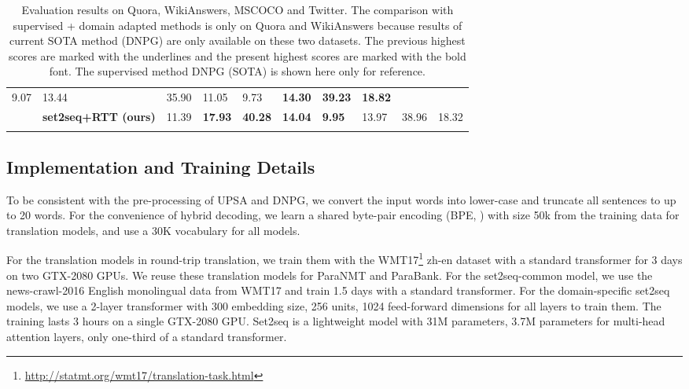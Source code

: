\begin{table*}[ht]
\begin{tabular}{p{2cm}p{4cm}p{0.8cm}<{\centering}p{0.8cm}<{\centering}p{0.8cm}<{\centering}p{0.8cm}<{\centering}p{0.8cm}<{\centering}p{0.8cm}<{\centering}p{0.8cm}<{\centering}p{0.8cm}<{\centering}}
 9.07 & 13.44 & 35.90 & 11.05 &  9.73 & \textbf{14.30} & \textbf{39.23} & \textbf{18.82} \\
& \textbf{set2seq+RTT \scriptsize{(ours)}} & 
11.39 & \textbf{17.93} & \textbf{40.28} & \textbf{14.04} & \textbf{9.95} & 13.97 & 38.96 & 18.32 \\
\\ [-1.8ex]
\hline
\end{tabular}
\caption{
Evaluation results on Quora, WikiAnswers, MSCOCO and Twitter. The comparison 
with supervised + domain adapted methods is only on Quora and WikiAnswers 
because results of current SOTA method (DNPG) are only available on these 
two datasets.
The previous highest scores are marked with the underlines and the present highest scores are marked with the bold font.
The supervised method DNPG (SOTA) is shown here only for reference.}
\label{tab:result}
\end{table*}

\subsection{Implementation and Training Details} \label{sec:exset}
To be consistent with the pre-processing of UPSA and DNPG, we convert the input words into lower-case and truncate all sentences to up to 20 words. 
For the convenience of hybrid decoding, 
we learn a shared byte-pair encoding (BPE, \cite{sennrich2016edinburgh}) 
with size 50k from the training data for translation models, 
and use a 30K vocabulary for all models. 


For the translation models in round-trip translation, we train them with the WMT17\footnote{\url{http://statmt.org/wmt17/translation-task.html}} zh-en dataset \cite{ziemski2016united} with a standard transformer for 3 days on two GTX-2080 GPUs. We reuse these translation models for ParaNMT and ParaBank. For the set2seq-common model, we use the news-crawl-2016 English monolingual data from WMT17 and train 1.5 days with a standard transformer. For the domain-specific set2seq models, we use a 2-layer transformer with 300 embedding size, 256 units, 1024 feed-forward dimensions for all layers to train them. The training lasts 3 hours on a single GTX-2080 GPU. Set2seq is a lightweight model with 31M parameters, 3.7M parameters for multi-head attention layers, only one-third of a standard transformer.

